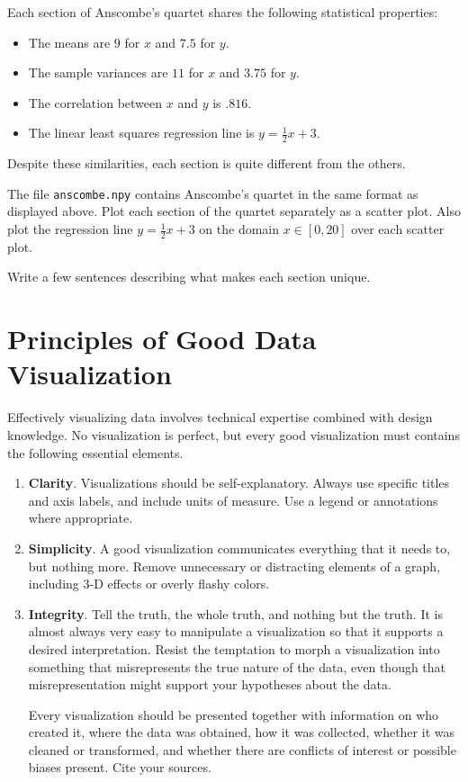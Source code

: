 Each section of Anscombe's quartet shares the following statistical properties:
\begin{itemize}
\setlength\itemsep{0em}
    \item The means are $9$ for $x$ and $7.5$ for $y$.
    \item The sample variances are $11$ for $x$ and $3.75$ for $y$.
    \item The correlation between $x$ and $y$ is $.816$.
    \item The linear least squares regression line is $y=\frac{1}{2}x+3$.
\end{itemize}

Despite these similarities, each section is quite different from the others.

\begin{problem} %
The file \texttt{anscombe.npy} contains Anscombe's quartet in the same format as displayed above.
Plot each section of the quartet separately as a scatter plot.
Also plot the regression line $y = \frac{1}{2}x + 3$ on the domain $x\in[0,20]$ over each scatter plot.

Write a few sentences describing what makes each section unique.
\label{prob:anscombes-quartet}
\end{problem}

\section*{Principles of Good Data Visualization} %

Effectively visualizing data involves technical expertise combined with design knowledge.
No visualization is perfect, but every good visualization must contains the following essential elements.

\begin{enumerate}
    \item \textbf{Clarity}.
    Visualizations should be self-explanatory.
    Always use specific titles and axis labels, and include units of measure.
    Use a legend or annotations where appropriate.

    \item \textbf{Simplicity}.
    A good visualization communicates everything that it needs to, but nothing more.
    Remove unnecessary or distracting elements of a graph, including 3-D effects or overly flashy colors.

    \item \textbf{Integrity}.
    Tell the truth, the whole truth, and nothing but the truth.
    It is almost always very easy to manipulate a visualization so that it supports a desired interpretation.
    Resist the temptation to morph a visualization into something that misrepresents the true nature of the data, even though that misrepresentation might support your hypotheses about the data.

    Every visualization should be presented together with information on who created it, where the data was obtained, how it was collected, whether it was cleaned or transformed, and whether there are conflicts of interest or possible biases present.
    Cite your sources.
\end{enumerate}

